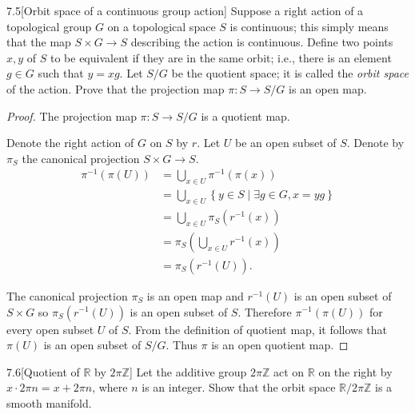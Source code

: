 \begin{problem}{7.5}[Orbit space of a continuous group action]\label{problem:7.5}
Suppose a right action of a topological group \(G\) on a topological space \(S\) is continuous; this simply means that the map \( S\times G \to S \) describing the action is continuous. Define two points \( x,y \) of \(S\) to be equivalent if they are in the same orbit; i.e., there is an element \( g\in G \) such that \( y = xg \). Let \( S/G \) be the quotient space; it is called the \textit{orbit space} of the action. Prove that the projection map \( \pi: S \to S/G \) is an open map.
\end{problem}

\begin{proof}
    The projection map \( \pi: S \to S/G \) is a quotient map.

    Denote the right action of \( G \) on \( S \) by \( r \). Let \( U \) be an open subset of \( S \). Denote by \( \pi_{S} \) the canonical projection \( S\times G \to S \).
    \begingroup
    \allowdisplaybreaks%
    \begin{align*}
        \pi^{-1}(\pi(U)) & = \bigcup_{x\in U} \pi^{-1}(\pi(x))                                     \\
                         & = \bigcup_{x\in U} \left\{ y \in S \mid \exists g\in G, x = yg \right\} \\
                         & = \bigcup_{x\in U} \pi_{S}(r^{-1}(x))                                   \\
                         & = \pi_{S}\left(\bigcup_{x\in U} r^{-1}(x)\right)                        \\
                         & = \pi_{S}(r^{-1}(U)).
    \end{align*}
    \endgroup

    The canonical projection \( \pi_{S} \) is an open map and \( r^{-1}(U) \) is an open subset of \( S\times G \) so \( \pi_{S}(r^{-1}(U)) \) is an open subset of \( S \). Therefore \( \pi^{-1}(\pi(U)) \) for every open subset \( U \) of \( S \). From the definition of quotient map, it follows that \( \pi(U) \) is an open subset of \( S/G \). Thus \( \pi \) is an open quotient map.
\end{proof}

\begin{problem}{7.6}[Quotient of \( \mathbb{R} \) by \( 2\pi\mathbb{Z} \)]\label{problem:7.6}
Let the additive group \( 2\pi\mathbb{Z} \) act on \( \mathbb{R} \) on the right by \( x\cdot 2\pi n = x + 2\pi n \), where \( n \) is an integer. Show that the orbit space \( \mathbb{R}/2\pi\mathbb{Z} \) is a smooth manifold.
\end{problem}

